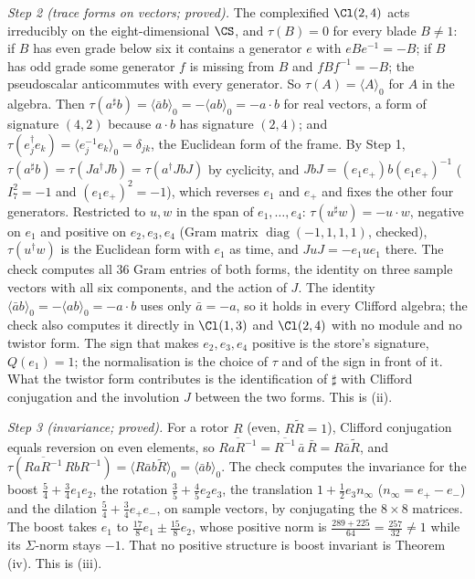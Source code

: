 \emph{Step 2 (trace forms on vectors; proved).} The complexified $\Cl(2,4)$ acts irreducibly on the eight-dimensional $\CS$, and $\tau(B) = 0$ for every blade $B \neq 1$: if $B$ has even grade below six it contains a generator $e$ with $eBe^{-1} = -B$; if $B$ has odd grade some generator $f$ is missing from $B$ and $fBf^{-1} = -B$; the pseudoscalar anticommutes with every generator. So $\tau(A) = \langle A\rangle_{0}$ for $A$ in the algebra. Then $\tau(a^{\sharp}b) = \langle\bar ab\rangle_{0} = -\langle ab\rangle_{0} = -a\cdot b$ for real vectors, a form of signature $(4,2)$ because $a\cdot b$ has signature $(2,4)$; and $\tau(e_{j}^{\dagger}e_{k}) = \langle e_{j}^{-1}e_{k}\rangle_{0} = \delta_{jk}$, the Euclidean form of the frame. By Step 1, $\tau(a^{\sharp}b) = \tau(Ja^{\dagger}Jb) = \tau(a^{\dagger}JbJ)$ by cyclicity, and $JbJ = (e_{1}e_{+})b(e_{1}e_{+})^{-1}$ ($I_{7}^{2} = -1$ and $(e_{1}e_{+})^{2} = -1$), which reverses $e_{1}$ and $e_{+}$ and fixes the other four generators. Restricted to $u, w$ in the span of $e_{1}, \dots, e_{4}$: $\tau(u^{\sharp}w) = -u\cdot w$, negative on $e_{1}$ and positive on $e_{2}, e_{3}, e_{4}$ (Gram matrix $\operatorname{diag}(-1, 1, 1, 1)$, checked), $\tau(u^{\dagger}w)$ is the Euclidean form with $e_{1}$ as time, and $JuJ = -e_{1}ue_{1}$ there. The check computes all $36$ Gram entries of both forms, the identity on three sample vectors with all six components, and the action of $J$. The identity $\langle\bar ab\rangle_{0} = -\langle ab\rangle_{0} = -a\cdot b$ uses only $\bar a = -a$, so it holds in every Clifford algebra; the check also computes it directly in $\Cl(1,3)$ and $\Cl(2,4)$ with no module and no twistor form. The sign that makes $e_{2}, e_{3}, e_{4}$ positive is the store's signature, $Q(e_{1}) = 1$; the normalisation is the choice of $\tau$ and of the sign in front of it. What the twistor form contributes is the identification of $\sharp$ with Clifford conjugation and the involution $J$ between the two forms. This is (ii).

\emph{Step 3 (invariance; proved).} For a rotor $R$ (even, $R\widetilde R = 1$), Clifford conjugation equals reversion on even elements, so $\overline{RaR^{-1}} = \overline{R^{-1}}\,\bar a\,\bar R = R\bar a\widetilde R$, and $\tau(\overline{RaR^{-1}}\,RbR^{-1}) = \langle R\bar ab\widetilde R\rangle_{0} = \langle\bar ab\rangle_{0}$. The check computes the invariance for the boost $\tfrac54 + \tfrac34e_{1}e_{2}$, the rotation $\tfrac35 + \tfrac45e_{2}e_{3}$, the translation $1 + \tfrac12e_{3}n_{\infty}$ ($n_{\infty} = e_{+} - e_{-}$) and the dilation $\tfrac54 + \tfrac34e_{+}e_{-}$, on sample vectors, by conjugating the $8 \times 8$ matrices. The boost takes $e_{1}$ to $\tfrac{17}{8}e_{1} \pm \tfrac{15}{8}e_{2}$, whose positive norm is $\tfrac{289 + 225}{64} = \tfrac{257}{32} \neq 1$ while its $\Sigma$-norm stays $-1$. That no positive structure is boost invariant is Theorem (iv). This is (iii).

